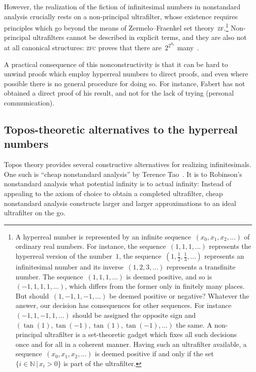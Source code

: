 \documentclass[oneside,reqno]{amsart}
\theoremstyle{definition}
\theoremstyle{plain}
\theoremstyle{remark}
\newcommand{\NN}{\mathbb{N}}
\renewcommand{\_}{\mathpunct{.}\,}
\newcommand{\?}{\,{:}\,}
\begin{document}
However, the realization of the fiction of infinitesimal numbers in nonstandard analysis crucially rests on a non-principal
ultrafilter, whose existence requires principles which go beyond the means of
Zermelo--Fraenkel set theory~\textsc{zf}.\footnote{A hyperreal number is
represented by an infinite sequence~$(x_0,x_1,x_2,\ldots)$ of ordinary real
numbers. For instance, the sequence~$(1,1,1,\ldots)$ represents the hyperreal
version of the number~$1$, the sequence~$(1,\frac{1}{2},\frac{1}{3},\ldots)$
represents an infinitesimal number and its inverse~$(1,2,3,\ldots)$ represents
a transfinite number.
%
The sequence~$(1,1,1,\ldots)$ is deemed positive, and so is~$(-1,1,1,1,\ldots)$,
which differs from the former only in finitely many places. But
should~$(1,-1,1,-1,\ldots)$ be deemed positive or negative? Whatever the
answer, our decision has consequences for other sequences. For
instance~$(-1,1,-1,1,\ldots)$ should be assigned the opposite sign
and~$(\tan(1),\tan(-1),\tan(1),\tan(-1),\ldots)$ the same.
%
A non-principal ultrafilter is a set-theoretic gadget which fixes all such
decisions once and for all in a coherent manner. Having such an ultrafilter
available, a sequence~$(x_0,x_1,x_2,\ldots)$ is deemed positive if and only if
the set~$\{i \in \NN \,|\, x_i > 0\}$ is part of the ultrafilter.}
Non-principal ultrafilters cannot be described in explicit terms, and
they are also not at all canonical structures: \textsc{zfc} proves that there
are~$2^{2^{\aleph_0}}$ many~\cite{pospisil:ultrafilters}.

A practical consequence of this nonconstructivity is that it can be hard to
unwind proofs which employ hyperreal numbers to direct proofs, and even where
possible there is no general procedure for doing so. For instance, Fabert has
not obtained a direct proof of his result, and not for the lack of trying
(personal communication).


\subsection{Topos-theoretic alternatives to the hyperreal numbers} Topos theory
provides several constructive alternatives for realizing infinitesimals.
One such is ``cheap nonstandard analysis'' by Terence Tao~\cite{tao:cheap-nsa}.
It is to Robinson's nonstandard analysis what potential infinity is
to actual infinity: Instead of appealing to the axiom of choice to
obtain a completed ultrafilter, cheap nonstandard analysis constructs larger
and larger approximations to an ideal ultrafilter on the go.
\end{document}
